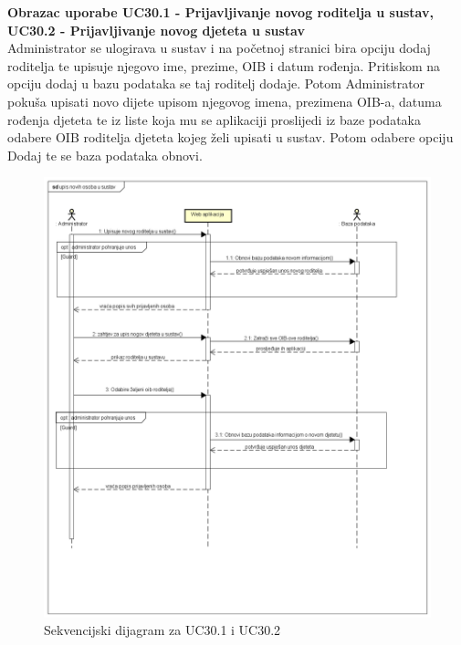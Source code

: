 				\eject
				
				
				\textbf{Obrazac uporabe UC30.1 - Prijavljivanje novog roditelja u sustav, UC30.2 - Prijavljivanje novog djeteta u sustav}\\
				
				Administrator se ulogirava u sustav i na početnoj stranici bira opciju dodaj roditelja te upisuje njegovo ime, prezime, OIB i datum rođenja. Pritiskom na opciju dodaj u bazu podataka se taj roditelj dodaje. Potom Administrator pokuša upisati novo dijete upisom njegovog imena, prezimena OIB-a, datuma rođenja djeteta te iz liste koja mu se aplikaciji proslijedi iz baze podataka odabere OIB roditelja djeteta kojeg želi upisati u sustav. Potom odabere opciju Dodaj te se baza podataka obnovi.
				\eject
				
				\begin{figure}[H]
					\includegraphics[width=\textwidth]{dijagrami/UpisNoveOsobeUSustavAdmin.PNG} %
					\caption{Sekvencijski dijagram za UC30.1 i UC30.2}
					\label{fig:promjene8} %
				\end{figure}
				
